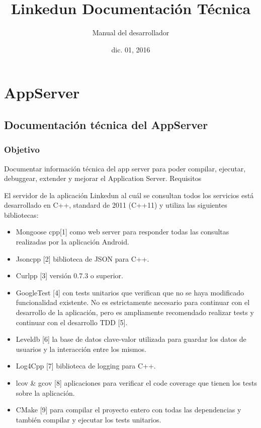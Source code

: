 \documentclass[a4paper,10pt,spanish]{sphinxmanual}
\title{Linkedun Documentación Técnica}
\date{dic. 01, 2016}
\author{Manual del desarrollador}
\begin{document}
\maketitle
\tableofcontents
{}\label{index::doc}



\chapter{AppServer}
\label{index:linkedun-manual-tecnico}\label{index:appserver}

\section{Documentación técnica del AppServer}
\label{appServer::doc}\label{appServer:documentacion-tecnica-del-appserver}

\subsection{Objetivo}
\label{docTecnica:objetivo}\label{docTecnica::doc}
Documentar información técnica del app server para poder compilar, ejecutar, debuggear, extender y mejorar el Application Server.
Requisitos

El servidor de la aplicación Linkedun al cuál se consultan todos los servicios está desarrollado en C++, standard de 2011 (C++11) y utiliza las siguientes bibliotecas:
\begin{itemize}
\item {} 
Mongoose cpp{[}1{]} como web server para responder todas las consultas realizadas por la aplicación Android.

\item {} 
Jsoncpp {[}2{]} biblioteca de JSON para C++.

\item {} 
Curlpp {[}3{]} versión 0.7.3 o superior.

\item {} 
GoogleTest {[}4{]} con tests unitarios que verifican que no se haya modificado funcionalidad existente. No es estrictamente necesario para continuar con el desarrollo de la aplicación, pero es ampliamente recomendado realizar tests y continuar con el desarrollo TDD {[}5{]}.

\item {} 
Leveldb {[}6{]} la base de datos clave-valor utilizada para guardar los datos de usuarios y la interacción entre los mismos.

\item {} 
Log4Cpp {[}7{]} biblioteca de logging para C++.

\item {} 
lcov \& gcov {[}8{]} aplicaciones para verificar el code coverage que tienen los tests sobre la aplicación.

\item {} 
CMake {[}9{]} para compilar el proyecto entero con todas las dependencias y también compilar y ejecutar los tests unitarios.

\end{itemize}
\end{document}
